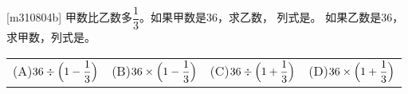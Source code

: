 [m310804b]\quad
甲数比乙数多$\dfrac{1}{3}$。如果甲数是36，求乙数，
列式是。
如果乙数是36，求甲数，列式是。 
\par
\hspace{7em}
\begin{tabular}{llll}
    (A)\quad $36\div \Bigl(1-\dfrac{1}{3}\Bigr)$ &
    (B)\quad $36\times \Bigl(1-\dfrac{1}{3}\Bigr)$ &
    (C)\quad $36\div \Bigl(1+\dfrac{1}{3}\Bigr)$ &
    (D)\quad $36\times \Bigl(1+\dfrac{1}{3}\Bigr)$
    \end{tabular}
\par